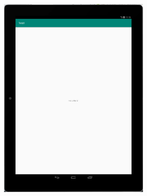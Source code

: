 \documentclass[answers]{exam}
\begin{document}
\begin{questions}
\begin{framed}
\begin{center}
        \includegraphics[height=10cm]{img/AndroidVirtualDevices_05.png}
    \end{center}
\end{framed}

\end{questions}
\end{document}
